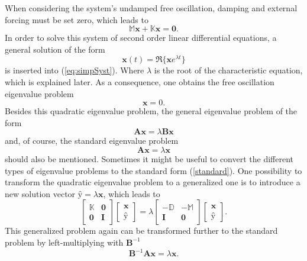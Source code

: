 \documentclass[conference]{journal}
\newcommand{\bb}[1]{\mathbb{#1}}
\newcommand{\M}{\bb{M}}
\newcommand{\K}{\bb{K}}
\newcommand{\D}{\bb{D}}
\begin{document}
	When considering the system's undamped free oscillation, damping and external forcing must be set zero, which leads to
	\begin{equation}\label{eq:simpSyst}
	\M\textbf{\"x}+\K\textbf{x}=\textbf{0}.
	\end{equation}
	In order to solve this system of second order linear differential equations, a general solution of the form
	\begin{equation}
	\textbf{x}(t)=\Re\{\textbf{\^x}e^{\lambda t}\}
	\end{equation}
	is inserted into (\ref{eq:simpSyst}). Where $\lambda$ is the root of the characteristic equation, which is explained later. As a consequence, one obtains the free oscillation eigenvalue problem
	\begin{equation}
	[\K+\lambda^2 \M]\textbf{\^x}=0.
	\end{equation}
	Besides this quadratic eigenvalue problem, the general eigenvalue problem of the form
	\begin{equation}
	\textbf{A\^x}=\lambda\textbf{B\^x}
	\end{equation}
	and, of course, the standard eigenvalue problem
	\begin{equation}\label{standard}
	\textbf{A\^x}=\lambda\textbf{\^x}
	\end{equation}
	should also be mentioned. Sometimes it might be useful to convert the different types of eigenvalue problems to the standard form (\ref{standard}). One possibility to transform the quadratic eigenvalue problem to a generalized one is to introduce a new solution vector $\textbf{\^y}=\lambda\textbf{\^x}$, which leads to
	\begin{equation}
	\begin{bmatrix}
	\K & \textbf{0} \\
	\textbf{0} & \textbf{I}
	\end{bmatrix}
	\begin{bmatrix}
	\textbf{\^x} \\
	\textbf{\^y}
	\end{bmatrix}
	=\lambda
	\begin{bmatrix}
	-\D & -\M \\
	\textbf{I} & \textbf{0}
	\end{bmatrix}
	\begin{bmatrix}
	\textbf{\^x} \\
	\textbf{\^y}
	\end{bmatrix}.
	\end{equation}
	This generalized problem again can be transformed further to the standard problem by left-multiplying with $\textbf{B}^{-1}$
	\begin{equation}
	\textbf{B}^{-1}\textbf{A\^x}=\lambda\textbf{\^x}.
	\end{equation}
	
\end{document}
